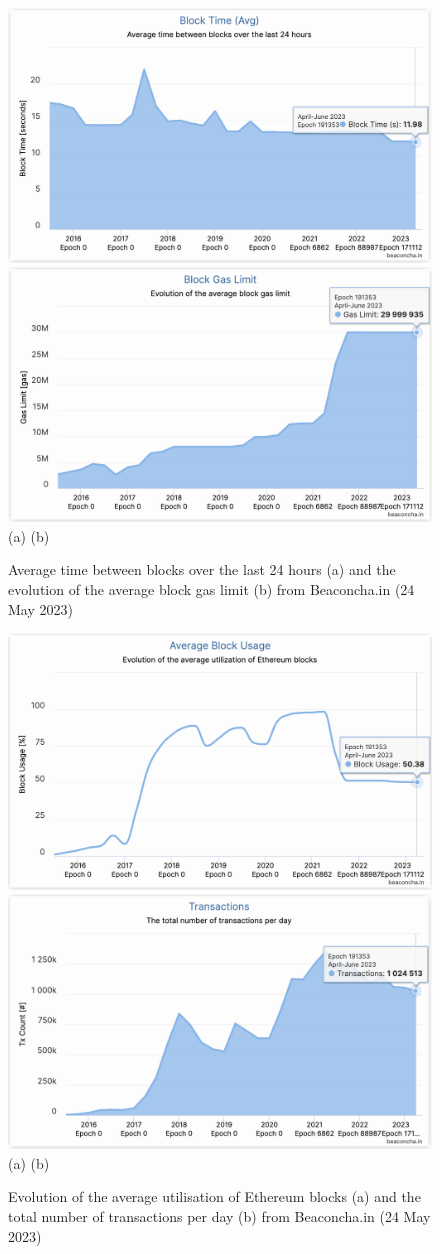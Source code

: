\documentclass[UTF8]{article}
\begin{document}
\begin{figure}[htbp]
\begin{center}
\includegraphics[width=0.48\linewidth]{images/bchart23}
\includegraphics[width=0.48\linewidth]{images/bchart24} \\
(a)\hspace{160pt}        (b)\\
\caption{Average time between blocks over the last 24 hours (a) and the evolution of the average block gas limit (b) from Beaconcha.in (24 May 2023)}
\label{fig:chart23}
\end{center}
\end{figure}

\begin{figure}[htbp]
\begin{center}
\includegraphics[width=0.48\linewidth]{images/bchart25}
\includegraphics[width=0.48\linewidth]{images/bchart26} \\
(a)\hspace{160pt}        (b)\\
\caption{Evolution of the average utilisation of Ethereum blocks (a) and the total number of transactions per day (b) from Beaconcha.in (24 May 2023)}
\label{fig:chart25}
\end{center}
\end{figure}
\end{document}
